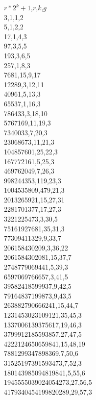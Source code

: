 ﻿$r*2^k+1$,$r$,$k$,$g$\\
3,1,1,2\\
5,1,2,2\\
17,1,4,3\\
97,3,5,5\\
193,3,6,5\\
257,1,8,3\\
7681,15,9,17\\
12289,3,12,11\\
40961,5,13,3\\
65537,1,16,3\\
786433,3,18,10\\
5767169,11,19,3\\
7340033,7,20,3\\
23068673,11,21,3\\
104857601,25,22,3\\
167772161,5,25,3\\
469762049,7,26,3\\
998244353,119,23,3\\
1004535809,479,21,3\\
2013265921,15,27,31\\
2281701377,17,27,3\\
3221225473,3,30,5\\
75161927681,35,31,3\\
77309411329,9,33,7\\
206158430209,3,36,22\\
2061584302081,15,37,7\\
2748779069441,5,39,3\\
6597069766657,3,41,5\\
39582418599937,9,42,5\\
79164837199873,9,43,5\\
263882790666241,15,44,7\\
1231453023109121,35,45,3\\
1337006139375617,19,46,3\\
3799912185593857,27,47,5\\
4222124650659841,15,48,19\\
7881299347898369,7,50,6\\
31525197391593473,7,52,3\\
180143985094819841,5,55,6\\
1945555039024054273,27,56,5\\
4179340454199820289,29,57,3
